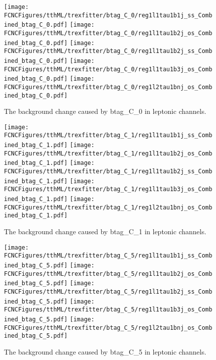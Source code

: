 \begin{figure}[H]
\centering
\texttt{[image: \\FCNCFigures/tthML/trexfitter/btag\_C\_0/reg1l1tau1b1j\_ss\_Combined\_btag\_C\_0.pdf]}
\texttt{[image: \\FCNCFigures/tthML/trexfitter/btag\_C\_0/reg1l1tau1b2j\_os\_Combined\_btag\_C\_0.pdf]}
\texttt{[image: \\FCNCFigures/tthML/trexfitter/btag\_C\_0/reg1l1tau1b2j\_ss\_Combined\_btag\_C\_0.pdf]}
\texttt{[image: \\FCNCFigures/tthML/trexfitter/btag\_C\_0/reg1l1tau1b3j\_os\_Combined\_btag\_C\_0.pdf]}
\texttt{[image: \\FCNCFigures/tthML/trexfitter/btag\_C\_0/reg1l2tau1bnj\_os\_Combined\_btag\_C\_0.pdf]}
\caption{The background change caused by btag\_C\_0 in leptonic channels.}
\label{fig:tthML_btag_C_0}
\end{figure}

\begin{figure}[H]
\centering
\texttt{[image: \\FCNCFigures/tthML/trexfitter/btag\_C\_1/reg1l1tau1b1j\_ss\_Combined\_btag\_C\_1.pdf]}
\texttt{[image: \\FCNCFigures/tthML/trexfitter/btag\_C\_1/reg1l1tau1b2j\_os\_Combined\_btag\_C\_1.pdf]}
\texttt{[image: \\FCNCFigures/tthML/trexfitter/btag\_C\_1/reg1l1tau1b2j\_ss\_Combined\_btag\_C\_1.pdf]}
\texttt{[image: \\FCNCFigures/tthML/trexfitter/btag\_C\_1/reg1l1tau1b3j\_os\_Combined\_btag\_C\_1.pdf]}
\texttt{[image: \\FCNCFigures/tthML/trexfitter/btag\_C\_1/reg1l2tau1bnj\_os\_Combined\_btag\_C\_1.pdf]}
\caption{The background change caused by btag\_C\_1 in leptonic channels.}
\label{fig:tthML_btag_C_1}
\end{figure}

\begin{figure}[H]
\centering
\texttt{[image: \\FCNCFigures/tthML/trexfitter/btag\_C\_5/reg1l1tau1b1j\_ss\_Combined\_btag\_C\_5.pdf]}
\texttt{[image: \\FCNCFigures/tthML/trexfitter/btag\_C\_5/reg1l1tau1b2j\_os\_Combined\_btag\_C\_5.pdf]}
\texttt{[image: \\FCNCFigures/tthML/trexfitter/btag\_C\_5/reg1l1tau1b2j\_ss\_Combined\_btag\_C\_5.pdf]}
\texttt{[image: \\FCNCFigures/tthML/trexfitter/btag\_C\_5/reg1l1tau1b3j\_os\_Combined\_btag\_C\_5.pdf]}
\texttt{[image: \\FCNCFigures/tthML/trexfitter/btag\_C\_5/reg1l2tau1bnj\_os\_Combined\_btag\_C\_5.pdf]}
\caption{The background change caused by btag\_C\_5 in leptonic channels.}
\label{fig:tthML_btag_C_5}
\end{figure}

